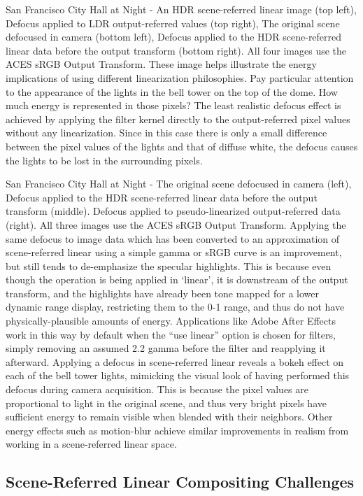 San Francisco City Hall at Night - An HDR scene-referred linear image (top left), Defocus applied to LDR output-referred values (top right), The original scene defocused in camera (bottom left), Defocus applied to the HDR scene-referred linear data before the output transform (bottom right). All four images use the ACES sRGB Output Transform.
These image helps illustrate the energy implications of using different linearization philosophies. Pay particular attention to the appearance of the lights in the bell tower on the top of the dome. How much energy is represented in those pixels? The least realistic defocus effect is achieved by applying the filter kernel directly to the output-referred pixel values without any linearization. Since in this case there is only a small difference between the pixel values of the lights and that of diffuse white, the defocus causes the lights to be lost in the surrounding pixels.


San Francisco City Hall at Night - The original scene defocused in camera (left), Defocus applied to the HDR scene-referred linear data before the output transform (middle). Defocus applied to pseudo-linearized output-referred data (right). All three images use the ACES sRGB Output Transform.
Applying the same defocus to image data which has been converted to an approximation of scene-referred linear using a simple gamma or sRGB curve is an improvement, but still tends to de-emphasize the specular highlights. This is because even though the operation is being applied in ‘linear’, it is downstream of the output transform, and the highlights have already been tone mapped for a lower dynamic range display, restricting them to the 0-1 range, and thus do not have physically-plausible amounts of energy. Applications like Adobe After Effects work in this way by default when the “use linear” option is chosen for filters, simply removing an assumed 2.2 gamma before the filter and reapplying it afterward. Applying a defocus in scene-referred linear reveals a bokeh effect on each of the bell tower lights, mimicking the visual look of having performed this defocus during camera acquisition. This is because the pixel values are proportional to light in the original scene, and thus very bright pixels have sufficient energy to remain visible when blended with their neighbors. Other energy effects such as motion-blur achieve similar improvements in realism from working in a scene-referred linear space.

\subsection{Scene-Referred Linear Compositing Challenges}


